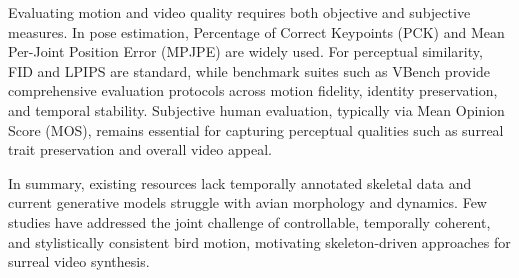 \documentclass[final-report]{report-template}
\begin{document}
Evaluating motion and video quality requires both objective and subjective measures. In pose estimation, Percentage of Correct Keypoints (PCK) \cite{Andriluka2014MPII} and Mean Per-Joint Position Error (MPJPE) \cite{Ionescu2014H36M} are widely used. For perceptual similarity, FID \cite{Heusel2017FID} and LPIPS \cite{Zhang2018LPIPS} are standard, while benchmark suites such as VBench \cite{Huang2024VBench} provide comprehensive evaluation protocols across motion fidelity, identity preservation, and temporal stability. Subjective human evaluation, typically via Mean Opinion Score (MOS), remains essential for capturing perceptual qualities such as surreal trait preservation and overall video appeal.


In summary, existing resources lack temporally annotated skeletal data and current generative models struggle with avian morphology and dynamics. Few studies have addressed the joint challenge of controllable, temporally coherent, and stylistically consistent bird motion, motivating skeleton-driven approaches for surreal video synthesis.




\end{document}
